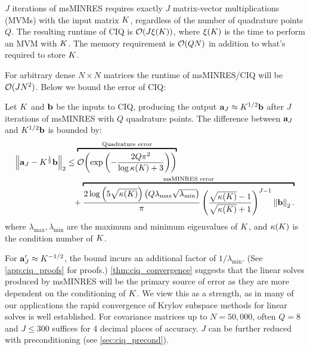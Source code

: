 \begin{property}
  $J$ iterations of msMINRES requires exactly $J$ matrix-vector multiplications (MVMs) with the input matrix $K$,
  regardless of the number of quadrature points $Q$.
  The resulting runtime of CIQ is $\bigo{ J \mvm{\bK}}$, where $\xi ( K )$ is the time to perform an MVM with $K$.
  The memory requirement is $\bigo{ QN }$ in addition to what's required to store $K$.
  \label{prop:msminres}
\end{property}
%
\noindent
For arbitrary dense $N \! \times \! N$ matrices the runtime of msMINRES/CIQ will be $\bigo{J N^2}$.
Below we bound the error of CIQ:
%
\begin{theorem}
  Let $K$ and $\mathbf{b}$ be the inputs to CIQ, producing the output $\mathbf{a}_J \approx K^{1/2} \mathbf{b}$ after $J$ iterations of msMINRES with $Q$ quadrature points.
  The difference between $\mathbf{a}_J$ and $K^{1/2} \mathbf{b}$ is bounded by:
  \begin{align*}
    \left\Vert \ba_J - \bK^{\frac 1 2} \bb \right\Vert_2
    &\leq
    \overbracket{
      \bigo{\exp\left( -\frac  {2 Q \pi^2}{\log \kappa(\bK) + 3} \right)}
    }^{\text{Quadrature error}}
    \\
    &\phantom{=} +
    \overbracket{
      \frac{ 2 \log \left( 5 \sqrt{\kappa(\bK)} \right)  \left( Q \lambda_\text{max} \sqrt{\lambda_\text{min}} \right) }{\pi}
      \left( \frac{ \sqrt{\kappa(\bK)} - 1}{ \sqrt{\kappa(\bK)} + 1} \right)^{J-1}
      \left\Vert \bb \right\Vert_2.
    }^{\text{msMINRES error}}
  \end{align*}
  where $\lambda_\text{max},\lambda_{\text{min}}$ are the maximum and minimum eigenvalues of $K$, and $\kappa(K)$ is the condition number of $K$.
  \label{thm:ciq_convergence}
\end{theorem}
%
\noindent
For $\mathbf{a}'_J \approx K^{-1/2}$, the bound incurs an additional factor of $1/\lambda_\text{min}$.
(See \cref{app:ciq_proofs} for proofs.)
\cref{thm:ciq_convergence} suggests that the linear solves produced by msMINRES will be the primary source of error as they are more dependent on the conditioning of $K$.
We view this as a strength, as in many of our applications the rapid convergence of Krylov subspace methods for linear solves is well established.
For covariance matrices up to $N=50,\!000$, often $Q=8$ and $J\leq300$ suffices for 4 decimal places of accuracy.
$J$ can be further reduced with preconditioning (see \cref{sec:ciq_precond}).



